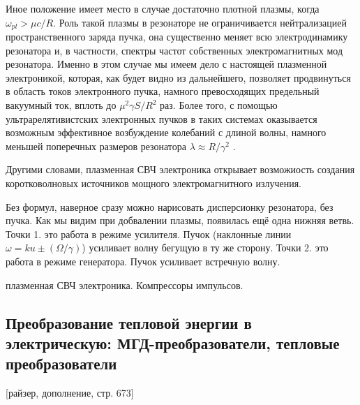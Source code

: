 \documentclass[10pt, a4paper]{article}
\numberwithin{equation}{section}
\begin{document}
Иное положение имеет место в случае достаточно плотной плазмы, когда $\omega_{pl}>\mu c/R$. Роль такой плазмы в резонаторе не ограничивается нейтрализацией пространственного заряда пучка, она существенно меняет всю электродинамику резонатора и, в частности, спектры частот собственных электромагнитных мод резонатора. Именно в этом случае мы имеем дело с настоящей плазменной электроникой, которая, как будет видно из дальнейшего, позволяет продвинуться в область токов электронного пучка, намного превосходящих предельный вакуумный ток, вплоть до $\mu^{2}\gamma S/R^{2}$ раз. Более того, с помощью ультрарелятивистских электронных пучков в таких системах оказывается возможным эффективное возбуждение колебаний с длиной волны, намного меньшей поперечных размеров резонатора $\lambda \approx R/\gamma^{2}$ .

\begin{figure}[h!]
\end{figure}

Другими словами, плазменная СВЧ электроника открывает возможиость создания коротковолновых источников мощного электромагнитного излучения.


Без формул, наверное сразу можно нарисовать дисперсионку резонатора, без пучка.  Как мы видим при добвалении плазмы, появилась ещё одна нижняя ветвь. Точки 1. это работа в режиме усилителя. Пучок (наклонные линии $\omega=ku\pm (\Omega/\gamma)$) усиливает волну бегущую в ту же сторону. Точки 2. это работа в режиме генератора. Пучок усиливает встречную волну.



плазменная СВЧ электроника.
Компрессоры импульсов.


\subsection{Преобразование тепловой энергии в электрическую: МГД-преобразователи, тепловые преобразователи}
\label{14.5} 
[райзер, дополнение, стр. 673]
\end{document}
